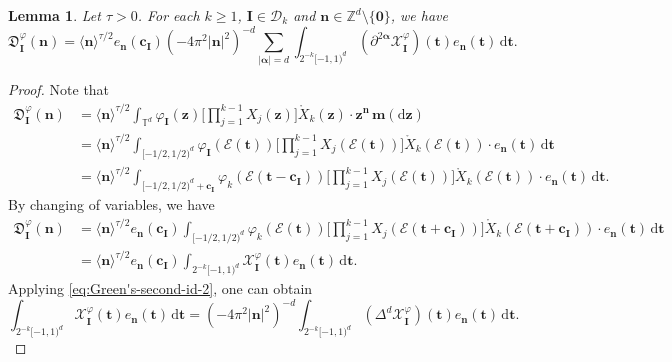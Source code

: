 \documentclass[12pt]{amsart}
\newtheorem{lemma}[theorem]{Lemma}
\theoremstyle{definition}
\theoremstyle{remark}
\newcommand{\bt}{\boldsymbol{t}}
\newcommand{\bz}{\boldsymbol{z}}
\newcommand{\Z}{\mathbb{Z}}
\newcommand{\T}{\mathbb{T}}
\numberwithin{equation}{section}
\begin{document}
\begin{lemma}\label{lemma:integration-by-parts}
Let $\tau>0$. For each $k\ge 1$, $\boldsymbol{I}\in \mathscr{D}_k$ and $\boldsymbol{n}\in \Z^d\setminus\{\boldsymbol{0}\}$, we have
\[
\mathfrak{D}_{\boldsymbol{I}}^\varphi(\boldsymbol{n})=\langle \boldsymbol{n}\rangle^{\tau/2}e_{\boldsymbol{n}}(\boldsymbol{c}_{\boldsymbol{I}})(-4\pi^2|\boldsymbol{n}|^2)^{-d}\sum_{|\boldsymbol{\alpha}|=d}\int_{2^{-k}[-1,1)^d}(\partial^{2\boldsymbol{\alpha}}\mathcal{X}_{\boldsymbol{I}}^\varphi)(\bt)e_{\boldsymbol{n}}(\bt)\,\mathrm{d}\bt.
\]
\end{lemma}
\begin{proof}
Note that
\begin{align*}
\mathfrak{D}_{\boldsymbol{I}}^\varphi(\boldsymbol{n})&=\langle \boldsymbol{n}\rangle^{\tau/2}\int_{\T^d}\varphi_{\boldsymbol{I}}(\bz) \bigg[\prod_{j=1}^{k-1}X_j(\bz)\bigg]\mathring{X}_k(\bz)\cdot \bz^{\boldsymbol{n}}\,\boldsymbol{m}(\mathrm{d}\bz)\\
&=\langle \boldsymbol{n}\rangle^{\tau/2}\int_{[-1/2,1/2)^d}\varphi_{\boldsymbol{I}}(\mathcal{E}(\bt))\bigg[\prod_{j=1}^{k-1}X_j(\mathcal{E}(\bt))\bigg] \mathring{X}_k(\mathcal{E}(\bt))\cdot e_{\boldsymbol{n}}(\bt)\,\mathrm{d}\bt\\
&=\langle \boldsymbol{n}\rangle^{\tau/2}\int_{[-1/2,1/2)^d+\boldsymbol{c_I}}\varphi_{k}(\mathcal{E}(\bt-\boldsymbol{c_I}))\bigg[\prod_{j=1}^{k-1}X_j(\mathcal{E}(\bt))\bigg] \mathring{X}_k(\mathcal{E}(\bt))\cdot e_{\boldsymbol{n}}(\bt)\,\mathrm{d}\bt.
\end{align*}
By changing of variables, we have
\begin{align*}
\mathfrak{D}_{\boldsymbol{I}}^\varphi(\boldsymbol{n})&=\langle \boldsymbol{n}\rangle^{\tau/2}e_{\boldsymbol{n}}(\boldsymbol{c}_{\boldsymbol{I}})\int_{[-1/2,1/2)^d}\varphi_{k}(\mathcal{E}(\bt)) \bigg[\prod_{j=1}^{k-1}X_j(\mathcal{E}(\bt+\boldsymbol{c_I}))\bigg] \mathring{X}_k(\mathcal{E}(\bt+\boldsymbol{c_I}))\cdot e_{\boldsymbol{n}}(\bt)\,\mathrm{d}\bt\\
&=\langle \boldsymbol{n}\rangle^{\tau/2}e_{\boldsymbol{n}}(\boldsymbol{c}_{\boldsymbol{I}})\int_{2^{-k}[-1,1)^d}\mathcal{X}_{\boldsymbol{I}}^\varphi(\bt)e_{\boldsymbol{n}}(\bt)\,\mathrm{d}\bt.
\end{align*}
Applying \eqref{eq:Green's-second-id-2}, one can obtain
\[
\int_{2^{-k}[-1,1)^d}\mathcal{X}_{\boldsymbol{I}}^\varphi(\bt)e_{\boldsymbol{n}}(\bt)\,\mathrm{d}\bt=(-4\pi^2 |\boldsymbol{n}|^2)^{-d}\int_{2^{-k}[-1,1)^d}(\Delta^d\mathcal{X}_{\boldsymbol{I}}^\varphi)(\bt) e_{\boldsymbol{n}}(\bt)\,\mathrm{d}\bt.
\]
\end{proof}
\end{document}
